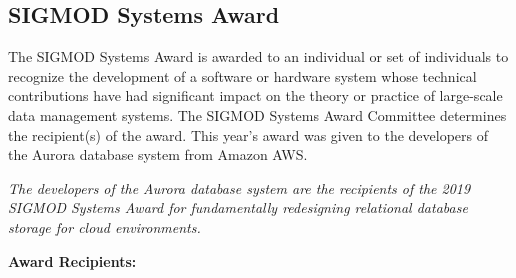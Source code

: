 \clearpage

\subsection*{SIGMOD Systems Award}

The SIGMOD Systems Award is awarded to an individual or set of individuals to recognize the development of a software or hardware system whose technical contributions have had significant impact on the theory or practice of large-scale data management systems.  The SIGMOD Systems Award Committee determines the recipient(s) of the award. This year's award was given to the developers of the Aurora database system from Amazon AWS.

\vspace{2mm}


\emph{The developers of the Aurora database system are the recipients of the 2019 SIGMOD Systems Award for fundamentally redesigning relational database storage for cloud environments.}


\vspace{4mm}
\textbf{Award Recipients:}
\vspace{2mm}

